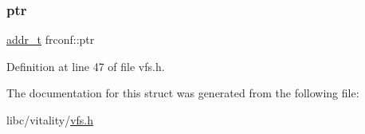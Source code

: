 \mbox{\label{a00314_aca270be7272453f34e2b8d9f70142702_aca270be7272453f34e2b8d9f70142702}} 
\subsubsection{\texorpdfstring{ptr}{ptr}}
{\footnotesize\ttfamily \hyperlink{a00134_a295f71165288684c38c6bb836fbb3c59_a295f71165288684c38c6bb836fbb3c59}{addr\+\_\+t} frconf\+::ptr}



Definition at line 47 of file vfs.\+h.



The documentation for this struct was generated from the following file\+:\begin{DoxyCompactItemize}
\item 
libc/vitality/\hyperlink{a00185}{vfs.\+h}\end{DoxyCompactItemize}
